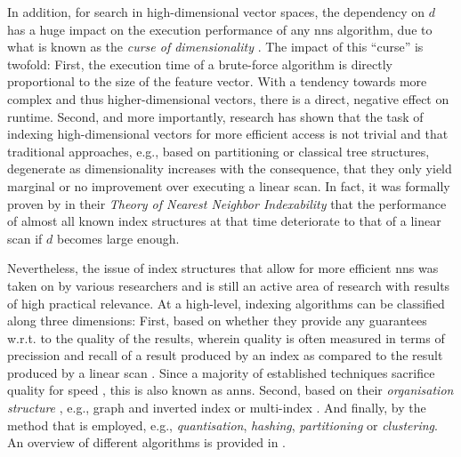 In addition, for search in high-dimensional vector spaces, the dependency on $d$ has a huge impact on the execution performance of any \acrshort{nns} algorithm, due to what is known as the \emph{curse of dimensionality} \cite{Indyk1998:Approximate,Zezula:2006Similarity}. The impact of this ``curse'' is twofold: First, the execution time of a brute-force algorithm is directly proportional to the size of the feature vector. With a tendency towards more complex and thus higher-dimensional vectors, there is a direct, negative effect on runtime. Second, and more importantly, research has shown that the task of indexing high-dimensional vectors for more efficient access is not trivial and that traditional approaches, e.g., based on partitioning or classical tree structures, degenerate as dimensionality increases \cite{Indyk1998:Approximate,Weber:1998Va} with the consequence, that they only yield marginal or no improvement over executing a linear scan. In fact, it was formally proven by \cite{Shaft:2006Theory} in their \emph{Theory of Nearest Neighbor Indexability} that the performance of almost all known index structures at that time deteriorate to that of a linear scan if $d$ becomes large enough.

Nevertheless, the issue of index structures that allow for more efficient \acrshort{nns} was taken on by various researchers and is still an active area of research with results of high practical relevance. At a high-level, indexing algorithms can be classified along three dimensions: First, based on whether they provide any guarantees w.r.t. to the quality of the results, wherein quality is often measured in terms of precission and recall of a result produced by an index as compared to the result produced by a linear scan \cite{Echihabi:2021High}. Since a majority of established techniques sacrifice quality for speed \cite{Siguroardottir:2005Quality}, this is also known as \acrfull{anns}. Second, based on their \emph{organisation structure} \cite{Shaft:2006Theory}, e.g., graph and inverted index \cite{Sivic:2003Video} or multi-index \cite{Babenko:2014Inverted}. And finally, by the method that is employed, e.g., \emph{quantisation}, \emph{hashing}, \emph{partitioning} or \emph{clustering}. An overview of different algorithms is provided in .

